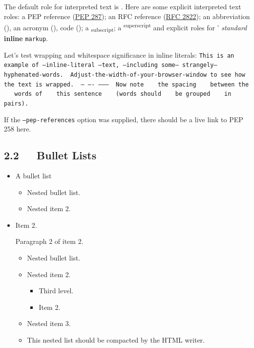 \documentclass[a4paper]{article}
\begin{document}
The default role for interpreted text is .  Here are
some explicit interpreted text roles: a PEP reference (\href{https://peps.python.org/pep-0287}{PEP 287}); an
RFC reference (\href{https://www.rfc-editor.org/info/rfc2822/}{RFC 2822}); an abbreviation (), an acronym
(), code (\texttt{}); a \textsubscript{subscript};
a \textsuperscript{superscript} and explicit roles for ’
\emph{standard} \textbf{inline} \texttt{markup}.


Let’s test wrapping and whitespace significance in inline literals:
\texttt{This is an example of --inline-literal --text, --including some--
strangely--hyphenated-words. ~Adjust-the-width-of-your-browser-window
to see how the text is wrapped. ~-- ---- -------- ~Now note ~ ~the
spacing ~ ~between the ~ ~words of ~ ~this sentence ~ ~(words
should ~ ~be grouped ~ ~in pairs).}

If the \texttt{--pep-references} option was supplied, there should be a
live link to PEP 258 here.


\subsection{2.2   Bullet Lists%
  \label{bullet-lists}%
}

\begin{itemize}
\item A bullet list

\begin{itemize}
\item Nested bullet list.

\item Nested item 2.
\end{itemize}

\item Item 2.

Paragraph 2 of item 2.

\begin{itemize}
\item Nested bullet list.

\item Nested item 2.

\begin{itemize}
\item Third level.

\item Item 2.
\end{itemize}

\item Nested item 3.

\item This nested list should be compacted by the HTML writer.

\label{target}
\end{itemize}
\end{itemize}
\end{document}
